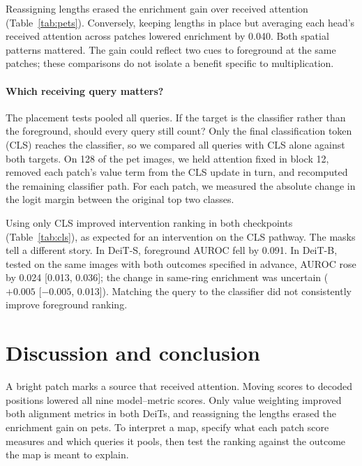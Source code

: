\documentclass{article}
\begin{document}
Reassigning lengths erased the enrichment gain over received attention (Table~\ref{tab:pets}). Conversely, keeping lengths in place but averaging each head's received attention across patches lowered enrichment by 0.040. Both spatial patterns mattered. The gain could reflect two cues to foreground at the same patches; these comparisons do not isolate a benefit specific to multiplication.

\paragraph{Which receiving query matters?} The placement tests pooled all queries. If the target is the classifier rather than the foreground, should every query still count? Only the final classification token (CLS) reaches the classifier, so we compared all queries with CLS alone against both targets. On 128 of the pet images, we held attention fixed in block 12, removed each patch's value term from the CLS update in turn, and recomputed the remaining classifier path. For each patch, we measured the absolute change in the logit margin between the original top two classes.

Using only CLS improved intervention ranking in both checkpoints (Table~\ref{tab:cls}), as expected for an intervention on the CLS pathway. The masks tell a different story. In DeiT-S, foreground AUROC fell by 0.091. In DeiT-B, tested on the same images with both outcomes specified in advance, AUROC rose by 0.024 [0.013, 0.036]; the change in same-ring enrichment was uncertain ($+0.005$ [$-0.005$, 0.013]). Matching the query to the classifier did not consistently improve foreground ranking.

\par\smallskip\noindent\begin{minipage}{\linewidth}
\label{tab:cls}\centering\small
\end{minipage}\par\smallskip
\section{Discussion and conclusion}
A bright patch marks a source that received attention. Moving scores to decoded positions lowered all nine model--metric scores. Only value weighting improved both alignment metrics in both DeiTs, and reassigning the lengths erased the enrichment gain on pets. To interpret a map, specify what each patch score measures and which queries it pools, then test the ranking against the outcome the map is meant to explain.
\end{document}
